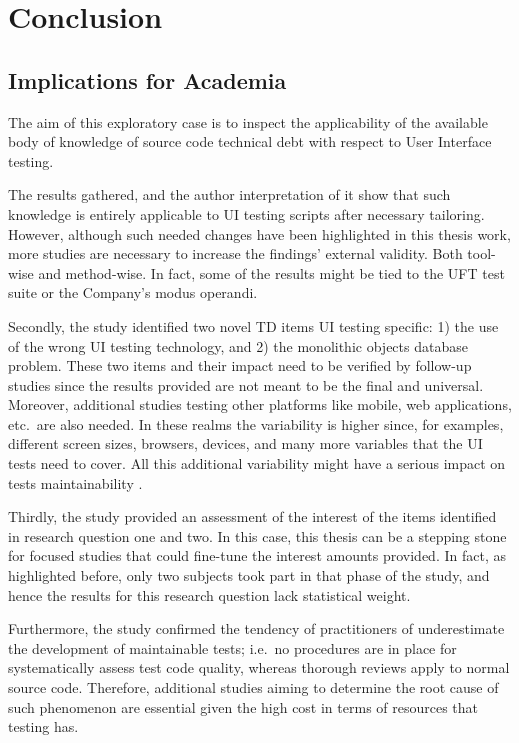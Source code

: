 \chapter{Conclusion}

\section{Implications for Academia}
The aim of this exploratory case is to inspect the applicability of the available body of knowledge of source code technical debt with respect to User Interface testing.

The results gathered, and the author interpretation of it show that such knowledge is entirely applicable to UI testing scripts after necessary tailoring. However, although such needed changes have been highlighted in this thesis work, more studies are necessary to increase the findings' external validity. Both tool-wise and method-wise. In fact, some of the results might be tied to the UFT test suite or the Company's modus operandi.

 Secondly, the study identified two novel TD items UI testing specific: 1) the use of the wrong UI testing technology, and 2) the monolithic objects database problem. These two items and their impact need to be verified by follow-up studies since the results provided are not meant to be the final and universal. Moreover, additional studies testing other platforms like mobile, web applications, etc.\ are also needed. In these realms the variability is higher since, for examples, different screen sizes, browsers, devices, and many more variables that the UI tests need to cover. All this additional variability might have a serious impact on tests maintainability .

Thirdly, the study provided an assessment of the interest of the items identified in research question one and two. In this case, this thesis can be a stepping stone for focused studies that could fine-tune the interest amounts provided. In fact, as highlighted before, only two subjects took part in that phase of the study, and hence the results for this research question lack statistical weight.

Furthermore, the study confirmed the tendency of practitioners of underestimate the development of maintainable tests; i.e.\ no procedures are in place for systematically assess test code quality, whereas thorough reviews apply to normal source code. Therefore, additional studies aiming to determine the root cause of such phenomenon are essential given the high cost in terms of resources that testing has.

